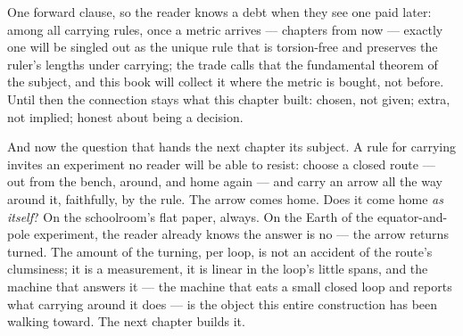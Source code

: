 One forward clause, so the reader knows a debt when they see one paid
later: among all carrying rules, once a metric arrives --- chapters from
now --- exactly one will be singled out as the unique rule that is
torsion-free and preserves the ruler's lengths under carrying; the trade
calls that the fundamental theorem of the subject, and this book will
collect it where the metric is bought, not before. Until then the
connection stays what this chapter built: chosen, not given; extra, not
implied; honest about being a decision.

And now the question that hands the next chapter its subject. A rule for
carrying invites an experiment no reader will be able to resist: choose a
closed route --- out from the bench, around, and home again --- and carry
an arrow all the way around it, faithfully, by the rule. The arrow comes
home. Does it come home \emph{as itself}? On the schoolroom's flat paper,
always. On the Earth of the equator-and-pole experiment, the reader
already knows the answer is no --- the arrow returns turned. The amount
of the turning, per loop, is not an accident of the route's clumsiness;
it is a measurement, it is linear in the loop's little spans, and the
machine that answers it --- the machine that eats a small closed loop and
reports what carrying around it does --- is the object this entire
construction has been walking toward. The next chapter builds it.
